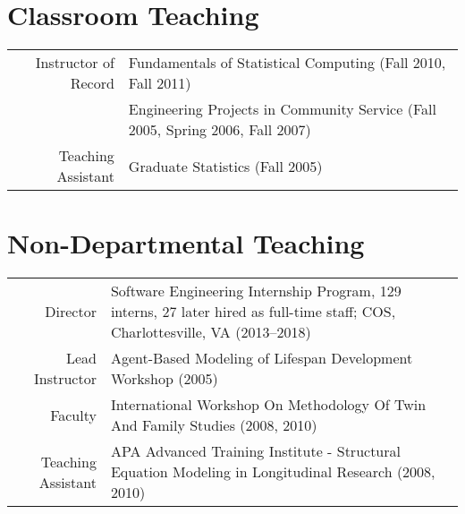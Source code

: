 \documentclass[11pt]{article}
\begin{document}
\section*{Classroom Teaching}
\begin{tabularx}{\textwidth}{rX}
	Instructor of Record  & \textbullet \hspace{.25em} Fundamentals of Statistical Computing (Fall 2010, Fall 2011)\\
                            		& \textbullet \hspace{.25em} Engineering Projects in Community Service (Fall 2005, Spring 2006, Fall 2007)\\
	Teaching Assistant    & \textbullet \hspace{.25em} Graduate Statistics (Fall 2005)\\
\end{tabularx}

\section*{Non-Departmental Teaching}
\begin{tabularx}{\textwidth}{rX}
	Director			& \textbullet \hspace{.25em} Software Engineering Internship Program, 129 interns, 27 later hired as full-time staff; COS, Charlottesville, VA (2013--2018)\\
	Lead Instructor		& \textbullet \hspace{.25em} Agent-Based Modeling of Lifespan Development Workshop (2005)\\
	Faculty			& \textbullet \hspace{.25em} International Workshop On Methodology Of Twin And Family Studies (2008, 2010)\\
	Teaching Assistant	& \textbullet \hspace{.25em} APA Advanced Training Institute - Structural Equation Modeling in Longitudinal Research (2008, 2010)\\
\end{tabularx}
\end{document}
